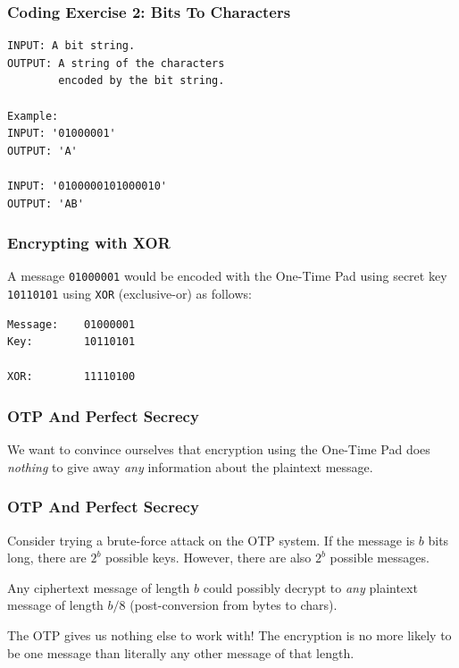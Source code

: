 \documentclass{beamer}
\newcommand{\<}{\langle}
\renewcommand{\>}{\rangle}
\begin{document}
\begin{frame}[fragile]
\frametitle{Coding Exercise 2: Bits To Characters}
\begin{verbatim}
INPUT: A bit string.
OUTPUT: A string of the characters 
        encoded by the bit string. 

Example:
INPUT: '01000001'
OUTPUT: 'A'

INPUT: '0100000101000010'
OUTPUT: 'AB'
\end{verbatim}
\end{frame}

\begin{frame}[fragile]
\frametitle{Encrypting with XOR}

A message \verb|01000001| would be encoded with the One-Time Pad using secret key \verb|10110101| using \verb|XOR| (exclusive-or) as follows:
\begin{verbatim}
Message:    01000001
Key:        10110101

XOR:        11110100
\end{verbatim}
\end{frame}


\begin{frame}
\frametitle{OTP And Perfect Secrecy}

We want to convince ourselves that encryption using the One-Time Pad does \emph{nothing} to give away \emph{any} information about the plaintext message. 
\end{frame}


\begin{frame}
\frametitle{OTP And Perfect Secrecy}

Consider trying a brute-force attack on the OTP system. If the message is $b$ bits long, there are $2^b$ possible keys. However, there are also $2^b$ possible messages. \newline

Any ciphertext message of length $b$ could possibly decrypt to \emph{any} plaintext message of length $b/8$ (post-conversion from bytes to chars). \newline

The OTP gives us nothing else to work with! The encryption is no more likely to be one message than literally any other message of that length. 
\end{frame}
\end{document}
